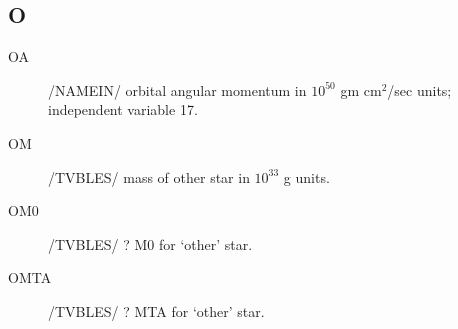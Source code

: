 \documentclass{article}
\begin{document}
\subsection*{O}
\begin{description}
    \item[OA]     	 	/NAMEIN/ orbital angular momentum in $10^{50}$ gm cm$^2$/sec units; independent variable 17.

    \item[OM]      	/TVBLES/ mass of other star in $10^{33}$ g units.

    \item[OM0]     	/TVBLES/ ? M0 for `other' star.
    
    \item[OMTA]    	/TVBLES/ ? MTA for `other' star.
    
\end{description}
\end{document}

